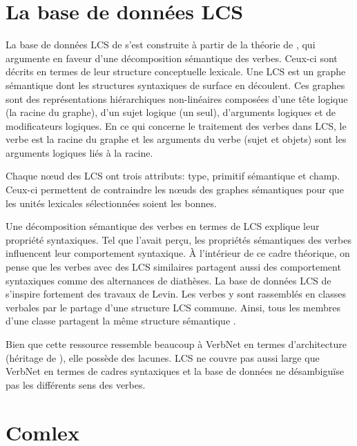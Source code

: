 \section{La base de données \ac{LCS}}
La base de données \ac{LCS} de \cite{DorrUseLexicalSemantics1992} s'est construite à partir de la théorie de \cite{Jackendoff1972-JACSII-2,JackendoffSemanticStructures1992}, qui argumente en faveur d'une décomposition sémantique des verbes. Ceux-ci sont décrits en termes de leur structure conceptuelle lexicale. Une LCS est un graphe sémantique dont les structures syntaxiques de surface en découlent. Ces graphes sont des représentations hiérarchiques non-linéaires composées d'une tête logique (la racine du graphe), d'un sujet logique (un seul), d'arguments logiques et de modificateurs logiques. En ce qui concerne le traitement des verbes dans LCS, le verbe est la racine du graphe et les arguments du verbe (sujet et objets) sont les arguments logiques liés à la racine.

Chaque n\oe{}ud des LCS ont trois attributs: type, primitif sémantique et champ. Ceux-ci permettent de contraindre les n\oe{}uds des graphes sémantiques pour que les unités lexicales sélectionnées soient les bonnes.

Une décomposition sémantique des verbes en termes de LCS explique leur propriété syntaxiques. Tel que \cite{verb-classes.levin.1993} l'avait perçu, les propriétés sémantiques des verbes influencent leur comportement syntaxique. À l'intérieur de ce cadre théorique, on pense que les verbes avec des LCS similaires partagent aussi des comportement syntaxiques comme des alternances de diathèses. La base de données LCS de \cite{DorrUseLexicalSemantics1992,AyanGeneratingParsingLexicon2002a} s'inspire fortement des travaux de Levin. Les verbes y sont rassemblés en classes verbales par le partage d'une structure LCS commune. Ainsi, tous les membres d'une classe partagent la même structure sémantique \citep{TraumGenerationLexicalConceptual2000}.

Bien que cette ressource ressemble beaucoup à VerbNet en termes d'architecture (héritage de \cite{verb-classes.levin.1993}), elle possède des lacunes. \ac{LCS} ne couvre pas aussi large que VerbNet en termes de cadres syntaxiques et la base de données ne désambiguïse pas les différents sens des verbes.


\section{Comlex}\label{comlex}

